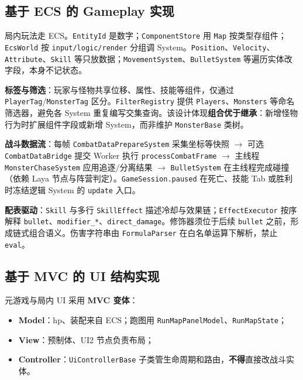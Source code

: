 \subsection{基于 ECS 的 Gameplay 实现}
\label{sec:ecs-design}

局内玩法走 ECS。\texttt{EntityId} 是数字；\texttt{ComponentStore} 用 \texttt{Map} 按类型存组件；\texttt{EcsWorld} 按 \texttt{input/logic/render} 分组调 System。\texttt{Position}、\texttt{Velocity}、\texttt{Attribute}、\texttt{Skill} 等只放数据；\texttt{MovementSystem}、\texttt{BulletSystem} 等遍历实体改字段，本身不记状态。

\textbf{标签与筛选}：玩家与怪物共享位移、属性、技能等组件，仅通过 \texttt{PlayerTag}/\texttt{MonsterTag} 区分。\texttt{FilterRegistry} 提供 \texttt{Players}、\texttt{Monsters} 等命名筛选器，避免各 System 重复编写交集查询。该设计体现\textbf{组合优于继承}：新增怪物行为时扩展组件字段或新增 System，而非维护 \texttt{MonsterBase} 类树。

\textbf{战斗数据流}：每帧 \texttt{CombatDataPrepareSystem} 采集坐标等快照 $\rightarrow$ 可选 \texttt{CombatDataBridge} 提交 Worker 执行 \texttt{processCombatFrame} $\rightarrow$ 主线程 \texttt{MonsterChaseSystem} 应用追逐/分离结果 $\rightarrow$ \texttt{BulletSystem} 在主线程完成碰撞（依赖 Laya 节点与阵营判定）。\texttt{GameSession.paused} 在死亡、技能 Tab 或胜利时冻结逻辑 System 的 \texttt{update} 入口。

\textbf{配表驱动}：\texttt{Skill} 与多行 \texttt{SkillEffect} 描述冷却与效果链；\texttt{EffectExecutor} 按序解释 \texttt{bullet}、\texttt{modifier\_*}、\texttt{direct\_damage}。修饰器须位于后续 \texttt{bullet} 之前，形成链式组合语义。伤害字符串由 \texttt{FormulaParser} 在白名单运算下解析，禁止 \texttt{eval}。

\subsection{基于 MVC 的 UI 结构实现}
\label{sec:mvc-design}

元游戏与局内 UI 采用 \textbf{MVC 变体}\cite{heijstek2011empirical}：
\begin{itemize}
  \item \textbf{Model}：hp、装配来自 ECS；跑图用 \texttt{RunMapPanelModel}、\texttt{RunMapState}；
  \item \textbf{View}：预制体、UI2 节点负责布局；
  \item \textbf{Controller}：\texttt{UiControllerBase} 子类管生命周期和路由，\textbf{不得}直接改战斗实体。
\end{itemize}

